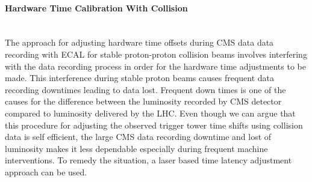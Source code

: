 \paragraph{Hardware Time Calibration With Collision} \mbox{}\\
The approach for adjusting hardware time offsets during CMS data data recording with ECAL for stable proton-proton collision beams involves interfering with the data recording process in order for the hardware time adjustments to be made. This interference during stable proton beams causes frequent data recording downtimes leading to data lost. Frequent down times is one of the causes for the difference between the luminosity recorded by CMS detector compared to luminosity delivered by the LHC.
Even though we can argue that this procedure for adjusting the observed trigger tower time shifts using collision data is self efficient, the large CMS data recording downtime and lost of luminosity makes it less dependable especially during frequent machine interventions.
To remedy the situation, a laser based time latency adjustment approach can be used.
